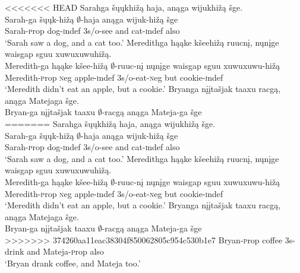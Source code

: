 \documentclass[output=paper]{LSP/langsci}
\begin{document}
\begin{exe}
\ex
\begin{xlist}
\ex
<<<<<<< HEAD
\glll Sarahga šųųkhižą haja, anąga wijukhižą šge.\\
Sarah-ga šųųk-hižą $\emptyset$-haja anąga wijuk-hižą šge\\
Sarah-{\textsc prop} dog-{\textsc indef} {\textsc 3s/o}-see and cat-{\textsc indef} also\\
\trans `Sarah saw a dog, and a cat too.'
 \ex
\glll Meredithga hąąke kšeehižą ruucnį, nųnįge {waisgap sguu xuwuxuwuhižą}.\\
Meredith-ga hąąke kšee-hižą $\emptyset$-ruuc-nį nųnįge {waisgap sguu xuwuxuwu-hižą}\\
Meredith-{\textsc prop} {\textsc neg} apple-{\textsc indef} {\textsc 3s/o}-eat-{\textsc neg} but cookie-{\textsc indef}\\
\trans `Meredith didn't eat an apple, but a cookie.'
 \ex
\glll Bryanga {nįįtašjak taaxu} racgą, anąga Matejaga šge.\\
Bryan-ga {nįįtašjak taaxu} $\emptyset$-racgą anąga Mateja-ga šge\\
=======
\glll Sarahga \v{s}\k{u}\k{u}khi\v{z}\k{a} haja, an\k{a}ga wijukhi\v{z}\k{a} \v{s}ge.\\
Sarah-ga \v{s}\k{u}\k{u}k-hi\v{z}\k{a} $\emptyset$-haja an\k{a}ga wijuk-hi\v{z}\k{a} \v{s}ge\\
Sarah-{\textsc prop} dog-{\textsc indef} {\textsc 3s/o}-see and cat-{\textsc indef} also\\
\trans `Sarah saw a dog, and a cat too.'
 \ex
\glll Meredithga h\k{a}\k{a}ke k\v{s}eehi\v{z}\k{a} ruucn\k{i}, n\k{u}n\k{i}ge {waisgap sguu xuwuxuwuhi\v{z}\k{a}}.\\
Meredith-ga h\k{a}\k{a}ke k\v{s}ee-hi\v{z}\k{a} $\emptyset$-ruuc-n\k{i} n\k{u}n\k{i}ge {waisgap sguu xuwuxuwu-hi\v{z}\k{a}}\\
Meredith-{\textsc prop} {\textsc neg} apple-{\textsc indef} {\textsc 3s/o}-eat-{\textsc neg} but cookie-{\textsc indef}\\
\trans `Meredith didn't eat an apple, but a cookie.'
 \ex
\glll Bryanga {n\k{i}\k{i}ta\v{s}jak taaxu} racg\k{a}, an\k{a}ga Matejaga \v{s}ge.\\
Bryan-ga {n\k{i}\k{i}ta\v{s}jak taaxu} $\emptyset$-racg\k{a} an\k{a}ga Mateja-ga \v{s}ge\\
>>>>>>> 374260aa11eac38304f850062805c954c530b1e7
Bryan-{\textsc prop} coffee {\textsc 3s}-drink and Mateja-{\textsc prop} also\\
\trans `Bryan drank coffee, and Mateja too.'
\end{xlist}
\end{exe}
\end{document}
